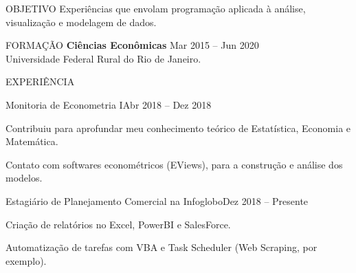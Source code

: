 \documentclass{resume} %
\begin{document}

\begin{rSection}{OBJETIVO}
    Experiências que envolam programação aplicada à análise, visualização e modelagem de dados.
    \vspace{5mm}
\end{rSection}


\begin{rSection}{FORMAÇÃO}
    {\bf Ciências Econômicas} \hfill {Mar 2015 -- Jun 2020}
    \\
    Universidade Federal Rural do Rio de Janeiro.
    \\
\end{rSection}


\begin{rSection}{EXPERIÊNCIA}
    \begin{rSubsection}{Monitoria de Econometria I}{Abr 2018 -- Dez 2018}{}
    \item
    \item Contribuiu para aprofundar meu conhecimento teórico de Estatística, Economia e Matemática.
    \item Contato com softwares econométricos (EViews), para a construção e análise dos modelos.
        \vspace{5mm}
    \end{rSubsection}

    \begin{rSubsection}{Estagiário de Planejamento Comercial na Infoglobo}{Dez 2018 -- Presente}{}
    \item
    \item Criação de relatórios no Excel, PowerBI e SalesForce.
    \item Automatização de tarefas com VBA e Task Scheduler (Web Scraping, por exemplo).
        \vspace{5mm}
    \end{rSubsection}
\end{rSection}
\end{document}
